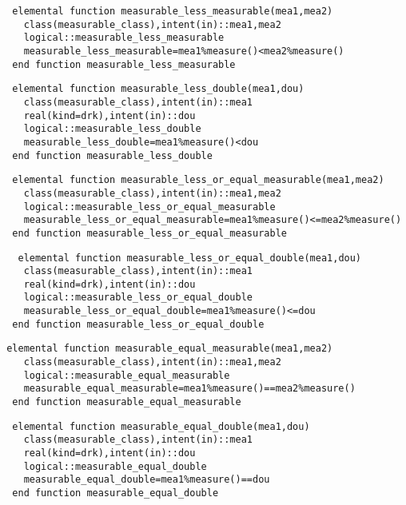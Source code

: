 \begin{Verbatim}
  elemental function measurable_less_measurable(mea1,mea2)
    class(measurable_class),intent(in)::mea1,mea2
    logical::measurable_less_measurable
    measurable_less_measurable=mea1%measure()<mea2%measure()
  end function measurable_less_measurable
\end{Verbatim}
  
\begin{Verbatim}
  elemental function measurable_less_double(mea1,dou)
    class(measurable_class),intent(in)::mea1
    real(kind=drk),intent(in)::dou
    logical::measurable_less_double
    measurable_less_double=mea1%measure()<dou
  end function measurable_less_double
\end{Verbatim}
  
\begin{Verbatim}
  elemental function measurable_less_or_equal_measurable(mea1,mea2)
    class(measurable_class),intent(in)::mea1,mea2
    logical::measurable_less_or_equal_measurable
    measurable_less_or_equal_measurable=mea1%measure()<=mea2%measure()
  end function measurable_less_or_equal_measurable
\end{Verbatim}

\begin{Verbatim}
   elemental function measurable_less_or_equal_double(mea1,dou)
    class(measurable_class),intent(in)::mea1
    real(kind=drk),intent(in)::dou
    logical::measurable_less_or_equal_double
    measurable_less_or_equal_double=mea1%measure()<=dou
  end function measurable_less_or_equal_double
\end{Verbatim}

\begin{Verbatim}
 elemental function measurable_equal_measurable(mea1,mea2)
    class(measurable_class),intent(in)::mea1,mea2
    logical::measurable_equal_measurable
    measurable_equal_measurable=mea1%measure()==mea2%measure()
  end function measurable_equal_measurable
\end{Verbatim}

\begin{Verbatim}
  elemental function measurable_equal_double(mea1,dou)
    class(measurable_class),intent(in)::mea1
    real(kind=drk),intent(in)::dou
    logical::measurable_equal_double
    measurable_equal_double=mea1%measure()==dou
  end function measurable_equal_double
\end{Verbatim}

